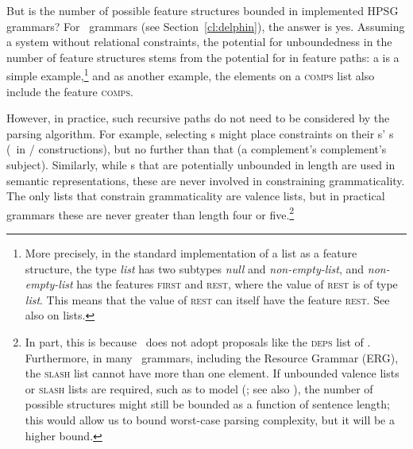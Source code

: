 \documentclass[output=paper
 	        ,biblatex
                ,babelshorthands
                ,newtxmath
                ,draftmode
                ,colorlinks, citecolor=brown
]{langscibook}
\begin{document}
\largerpage
But is the number of possible feature structures bounded
in implemented HPSG grammars?
For \delphin\ grammars (see Section~\ref{cl:delphin}),
the answer is yes.
Assuming a system without relational constraints,
the potential for unboundedness in the number of feature structures
stems from the potential for  in feature paths:
a  is a simple example,\footnote{%
	More precisely, in the standard implementation of a list as a feature structure,
	the type \textit{list} has two subtypes \textit{null} and \textit{non-empty-list}, and
	\textit{non-empty-list} has the features \textsc{first}
	and \textsc{rest}, where the value of \textsc{rest} is of type \textit{list}.
	This means that the value of \textsc{rest} can itself have the feature \textsc{rest}.
	See also \crossrefchapterw[\page \pageref{page-list-encoding}]{formal-background} on lists.
}
and as another example, the elements on a \textsc{comps} list
also include the feature \textsc{comps}.

However, in practice, such recursive paths do not need to be considered by the parsing algorithm.
For example, selecting s might place constraints on their s' s
(\eg\ in / constructions),
but no further than that (\eg a complement's complement's subject).
Similarly, while s that are potentially unbounded in length are used in semantic representations,
these are never involved in constraining grammaticality.
The only lists that constrain grammaticality are valence lists,
but in practical grammars these are never greater than length four or five.\footnote{%
	In part, this is because \delphin\ does not
	adopt proposals like the \textsc{deps} list of \citet*{BMS2001a}.
	Furthermore, in many \delphin\ grammars, including the  Resource Grammar (ERG),
	the \textsc{slash} list cannot have more than one element.
	If unbounded valence lists or \textsc{slash} lists are required,
	such as to model  (\citealp{Rentier94}; see also ),
	the number of possible structures might still be bounded as a function of sentence length;
	this would allow us to bound worst-case parsing complexity,
	but it will be a higher bound.
}
\end{document}
